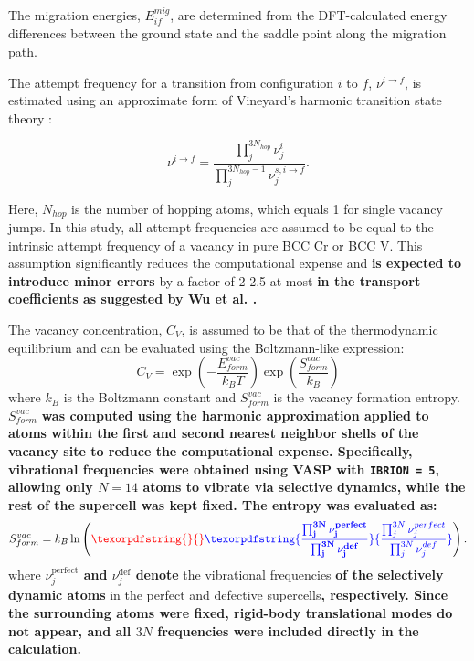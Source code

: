 \documentclass[preprint,12pt]{elsarticle}
\providecommand{\DIFaddtex}[1]{{\bf #1}} %
\providecommand{\DIFdeltex}[1]{} %
\providecommand{\DIFaddbegin}{\protect\color{blue}} %
\providecommand{\DIFaddend}{\protect\color{black}} %
\providecommand{\DIFdelbegin}{\protect\color{red}} %
\providecommand{\DIFdelend}{\protect\color{black}} %
\providecommand{\DIFadd}[1]{\texorpdfstring{\DIFaddtex{#1}}{#1}} %
\providecommand{\DIFdel}[1]{\texorpdfstring{\DIFdeltex{#1}}{}} %
\newcommand{\DIFscaledelfig}{0.5}
\newlength{\DIFdelgraphicswidth} %
\newlength{\DIFdelgraphicsheight} %
\newcommand{\DIFaddincludegraphics}[2][]{{\color{blue}\fbox{\DIFOincludegraphics[#1]{#2}}}} %
\newcommand{\DIFdelincludegraphics}[2][]{%
\sbox{\DIFdelgraphicsbox}{\DIFOincludegraphics[#1]{#2}}%
\settoboxwidth{\DIFdelgraphicswidth}{\DIFdelgraphicsbox} %
\settoboxtotalheight{\DIFdelgraphicsheight}{\DIFdelgraphicsbox} %
\scalebox{\DIFscaledelfig}{%
\parbox[b]{\DIFdelgraphicswidth}{\usebox{\DIFdelgraphicsbox}\\[-\baselineskip] \rule{\DIFdelgraphicswidth}{0em}}\llap{\resizebox{\DIFdelgraphicswidth}{\DIFdelgraphicsheight}{%
\setlength{\unitlength}{\DIFdelgraphicswidth}%
\begin{picture}(1,1)%
\thicklines\linethickness{2pt} %
{\color[rgb]{1,0,0}\put(0,0){\framebox(1,1){}}}%
{\color[rgb]{1,0,0}\put(0,0){\line( 1,1){1}}}%
{\color[rgb]{1,0,0}\put(0,1){\line(1,-1){1}}}%
\end{picture}%
}\hspace*{3pt}}} %
} %
\DeclareRobustCommand{\DIFaddbegin}{\DIFOaddbegin \let\includegraphics\DIFaddincludegraphics} %
\DeclareRobustCommand{\DIFaddend}{\DIFOaddend \let\includegraphics\DIFOincludegraphics} %
\DeclareRobustCommand{\DIFdelbegin}{\DIFOdelbegin \let\includegraphics\DIFdelincludegraphics} %
\DeclareRobustCommand{\DIFdelend}{\DIFOaddend \let\includegraphics\DIFOincludegraphics} %
\begin{document}
\noindent The migration energies, $E_{if}^{mig}$, are determined from the DFT-calculated energy differences between the ground state and the saddle point along the migration path. 

The attempt frequency for a transition from configuration $i$ to $f$, $\nu^{i\rightarrow f}$, is estimated using an approximate form of Vineyard's harmonic transition state theory \cite{vineyard_frequency_1957}:

\begin{equation} \nu^{i\rightarrow f} = \frac{\prod_{j}^{3N_{hop}} \nu^{i}_{j}}{\prod_{j}^{3N_{hop}-1} \nu^{s,i\rightarrow f}_j}. \end{equation}

\noindent Here, $N_{hop}$ is the number of hopping atoms, which equals 1 for single vacancy jumps. In this study, all attempt frequencies are assumed to be equal to the intrinsic attempt frequency of a vacancy in pure BCC Cr or BCC V. This assumption significantly reduces the computational expense and \DIFdelbegin \DIFdel{may only alter the transport coefficients }\DIFdelend \DIFaddbegin \DIFadd{is expected to introduce minor errors }\DIFaddend by a factor of 2-2.5 at most \DIFdelbegin \DIFdel{. 
}\DIFdelend \DIFaddbegin \DIFadd{in the transport coefficients as suggested by Wu et al. \cite{wu_high-throughput_2016}.
}\DIFaddend 

The vacancy concentration, $C_{V}$, is assumed to be that of the thermodynamic equilibrium and can be evaluated using the Boltzmann-like expression:
\begin{equation}
    C_{V} = \exp\left(-\frac{E_{form}^{vac}}{k_BT}\right) \exp\left(\frac{S_{form}^{vac}}{k_B}\right)
\end{equation}
where $k_B$ is the Boltzmann constant and $S_{form}^{vac}$ is the vacancy formation entropy. $S_{form}^{vac}$ \DIFdelbegin \DIFdel{is evaluated asfollows:
}\DIFdelend \DIFaddbegin \DIFadd{was computed using the harmonic approximation applied to atoms within the first and second nearest neighbor shells of the vacancy site to reduce the computational expense. Specifically, vibrational frequencies were obtained using VASP with \texttt{IBRION = 5}, allowing only $N = 14$ atoms to vibrate via selective dynamics, while the rest of the supercell was kept fixed. The entropy was evaluated as:
}\DIFaddend \begin{equation}
   S_{form}^{vac} = k_B \ln\left(\DIFdelbegin \DIFdel{\frac{\Pi^{3N-1}_j \nu_j^{perfect}}{\Pi^{3N-1}_j \nu_j^{def}}}\DIFdelend \DIFaddbegin \DIFadd{\frac{\prod^{3N}_j \nu_j^{perfect}}{\prod^{3N}_j \nu_j^{def}}}\DIFaddend \right).
\label{eq_entropy}
\end{equation}
where \DIFaddbegin \DIFadd{$\nu_j^{\text{perfect}}$ and $\nu_j^{\text{def}}$ denote }\DIFaddend the vibrational frequencies \DIFaddbegin \DIFadd{of the selectively dynamic atoms }\DIFaddend in the perfect and defective supercells\DIFdelbegin \DIFdel{are denoted by $\nu_j^{perfect}$, and $\nu_j^{def}$, respectively. }\DIFdelend \DIFaddbegin \DIFadd{, respectively. Since the surrounding atoms were fixed, rigid-body translational modes do not appear, and all $3N$ frequencies were included directly in the calculation.
}\DIFaddend 
\end{document}
